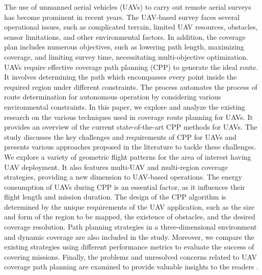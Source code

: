 \documentclass[11pt,epsf,times]{article}
\begin{document}
The use of unmanned aerial vehicles (UAVs) to carry out remote aerial surveys has become prominent in recent years. The UAV-based survey faces several operational issues, such as complicated terrain, limited UAV resources, obstacles, sensor limitations, and other environmental factors. In addition, the coverage plan includes numerous objectives, such as lowering path length, maximizing coverage, and limiting survey time, necessitating multi-objective optimization. UAVs require effective coverage path planning (CPP) to generate the ideal route. It involves determining the path which encompasses every point inside the required region under different constraints. The process automates the process of route determination for autonomous operation by considering various environmental constraints. In this paper, we explore and analyze the existing research on the various techniques used in coverage route planning for UAVs. It provides an overview of the current state-of-the-art CPP methods for UAVs. The study discusses the key challenges and requirements of CPP for UAVs and presents various approaches proposed in the literature to tackle these challenges. We explore a variety of geometric flight patterns for the area of interest having UAV deployment. It also features multi-UAV and multi-region coverage strategies, providing a new dimension to UAV-based operations. The energy consumption of UAVs during CPP is an essential factor, as it influences their flight length and mission duration. The design of the CPP algorithm is determined by the unique requirements of the UAV application, such as the size and form of the region to be mapped, the existence of obstacles, and the desired coverage resolution. Path planning strategies in a three-dimensional environment and dynamic coverage are also included in the study. Moreover, we compare the existing strategies using different performance metrics to evaluate the success of covering missions. Finally, the problems and unresolved concerns related to UAV coverage path planning are examined to provide valuable insights to the readers \cite{KUMAR2023}.\\
\end{document}
